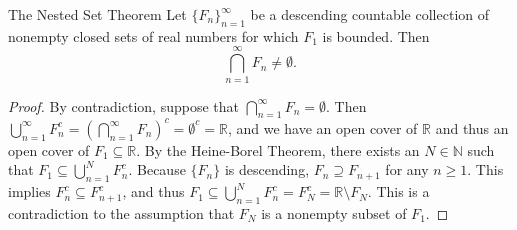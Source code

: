 \documentclass[a4paper,10pt]{book}
\theoremstyle{plain} %
\newcommand{\thistheoremname}{}
\newtheorem*{genericthm*}{\thistheoremname}
\newenvironment{namedthm*}[1]
	{\renewcommand{\thistheoremname}{#1}%
	\begin{genericthm*}}
	{\end{genericthm*}}
\begin{document}
\begin{namedthm*}{The Nested Set Theorem}
Let $\{F_n\}_{n=1}^\infty$ be a descending countable collection of nonempty closed sets of real numbers for which $F_1$ is bounded.
Then
\[
    \bigcap_{n=1}^\infty F_n \neq \emptyset.
\]
\end{namedthm*}
\begin{proof} 
By contradiction, suppose that $\bigcap_{n=1}^\infty F_n = \emptyset$. 
Then $\bigcup_{n=1}^\infty F_n^c = (\bigcap_{n=1}^\infty F_n)^c  = \emptyset^c = \mathbb{R}$, and we have an open cover of $\mathbb{R}$ and thus an open cover of $F_1 \subseteq \mathbb{R}$. 
By the Heine-Borel Theorem, there exists an $N \in \mathbb {N}$ such that $F_1 \subseteq \bigcup_{n=1}^N F_n^c$.  
Because $\{F_n\}$ is descending, $F_n \supseteq F_{n+1}$ for any $n \ge 1$. 
This implies $F_{n}^c \subseteq F_{n+1}^c$, and thus $F_1 \subseteq \bigcup_{n=1}^N F_n^c = F_N^c = \mathbb{R}\setminus F_N$.
This is a contradiction to the assumption that $F_N$ is a nonempty subset of $F_1$.
\end{proof}
\end{document}

